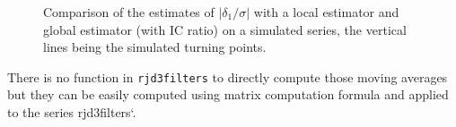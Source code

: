 \documentclass[
]{article}
\newcommand\1{\mathds{1}}
\begin{document}
\begin{figure}[H]

\caption{\label{fig-mmpenteconcac-ex}Comparison of the estimates of
\(|\delta_1/\sigma|\) with a local estimator and global estimator (with
IC ratio) on a simulated series, the vertical lines being the simulated
turning points.}

\begin{minipage}{\linewidth}



\end{minipage}%
\newline
\begin{minipage}{\linewidth}



\end{minipage}%

\end{figure}%

There is no function in \texttt{rjd3filters} to directly compute those
moving averages but they can be easily computed using matrix computation
formula and applied to the series rjd3filters`.
\end{document}
